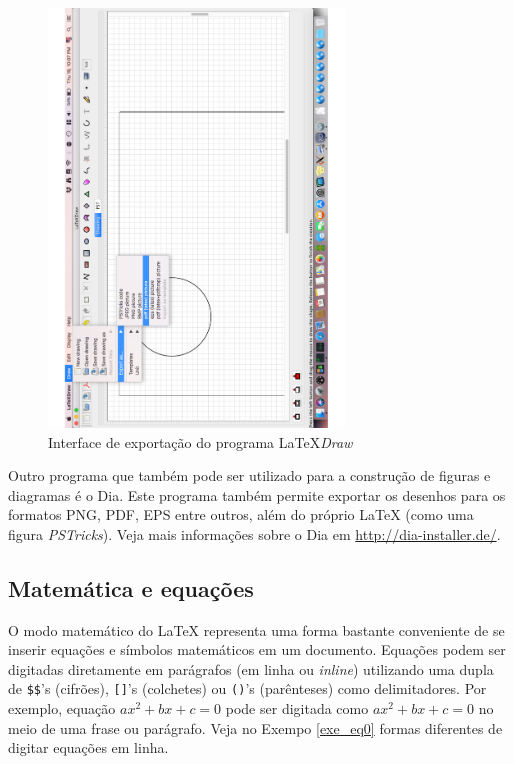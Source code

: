 \begin{figure}[H]
\caption{Interface de exportação do programa \LaTeX\textit{Draw}}
\vspace{6mm}
    \begin{center}
        \includegraphics[width=0.7\textwidth,angle=-90]{./docs/figs/ldraw3.pdf}
    \end{center}
\vspace{4mm}
\label{fig:interld}
\end{figure}

\begin{marker}
Outro programa que também pode ser utilizado para a construção de figuras e diagramas é o Dia. Este programa também permite exportar os desenhos para os formatos PNG, PDF, EPS entre outros, além do próprio \LaTeX{} (como uma figura \textit{PSTricks}). Veja mais informações sobre o Dia em \url{http://dia-installer.de/}.
\end{marker}

\subsection{Matemática e equações}
\label{sec:mat_eqs}

O modo matemático do \LaTeX{} representa uma forma bastante conveniente de se inserir equações e símbolos matemáticos em um documento. Equações podem ser digitadas diretamente em parágrafos (em linha ou \textit{inline}) utilizando uma dupla de {\tt \$\$}'s (cifrões), {\tt []}'s (colchetes) ou \texttt{()}'s (parênteses) como delimitadores. Por exemplo, equação $ax^2 + bx + c = 0$ pode ser digitada como \texttt{$ax^2 + bx + c = 0$} no meio de uma frase ou parágrafo. Veja no Exempo \ref{exe_eq0} formas diferentes de digitar equações em linha.

